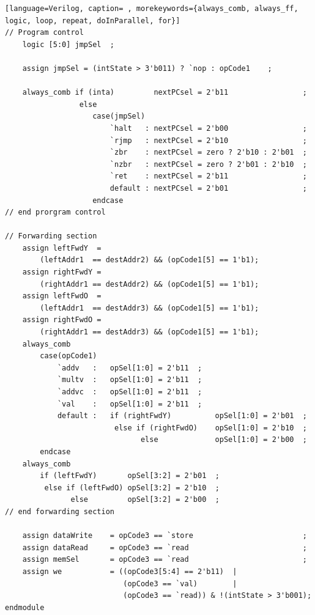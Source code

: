 {\begin{shaded*}
\begin{lstlisting}[language=Verilog, caption= , morekeywords={always_comb, always_ff, logic, loop, repeat, doInParallel, for}]
// Program control
    logic [5:0] jmpSel  ;

    assign jmpSel = (intState > 3'b011) ? `nop : opCode1    ;

    always_comb if (inta)         nextPCsel = 2'b11                 ;
                 else
                    case(jmpSel)
                        `halt   : nextPCsel = 2'b00                 ;
                        `rjmp   : nextPCsel = 2'b10                 ;
                        `zbr    : nextPCsel = zero ? 2'b10 : 2'b01  ;
                        `nzbr   : nextPCsel = zero ? 2'b01 : 2'b10  ;
                        `ret    : nextPCsel = 2'b11                 ;
                        default : nextPCsel = 2'b01                 ;
                    endcase
// end prorgram control

// Forwarding section
    assign leftFwdY  =
        (leftAddr1  == destAddr2) && (opCode1[5] == 1'b1);
    assign rightFwdY =
        (rightAddr1 == destAddr2) && (opCode1[5] == 1'b1);
    assign leftFwdO  =
        (leftAddr1  == destAddr3) && (opCode1[5] == 1'b1);
    assign rightFwdO =
        (rightAddr1 == destAddr3) && (opCode1[5] == 1'b1);
    always_comb
        case(opCode1)
            `addv   :   opSel[1:0] = 2'b11  ;
            `multv  :   opSel[1:0] = 2'b11  ;
            `addvc  :   opSel[1:0] = 2'b11  ;
            `val    :   opSel[1:0] = 2'b11  ;
            default :   if (rightFwdY)          opSel[1:0] = 2'b01  ;
                         else if (rightFwdO)    opSel[1:0] = 2'b10  ;
                               else             opSel[1:0] = 2'b00  ;
        endcase
    always_comb
        if (leftFwdY)       opSel[3:2] = 2'b01  ;
         else if (leftFwdO) opSel[3:2] = 2'b10  ;
               else         opSel[3:2] = 2'b00  ;
// end forwarding section

    assign dataWrite    = opCode3 == `store                         ;
    assign dataRead     = opCode3 == `read                          ;
    assign memSel       = opCode3 == `read                          ;
    assign we           = ((opCode3[5:4] == 2'b11)  |
                           (opCode3 == `val)        |
                           (opCode3 == `read)) & !(intState > 3'b001);
endmodule
\end{lstlisting}
\end{shaded*}
}

